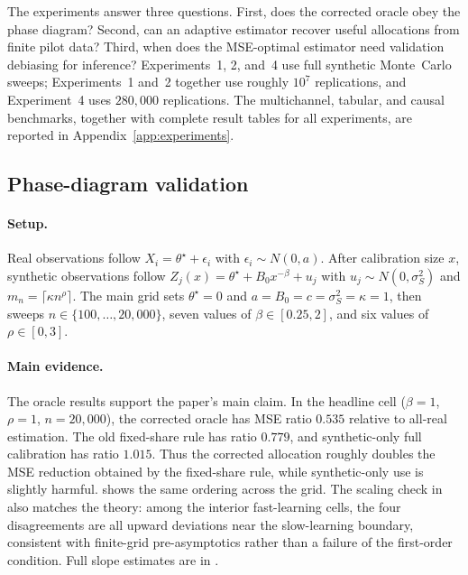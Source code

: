 \label{sec:experiments}

The experiments answer three questions. First, does the corrected oracle obey the phase diagram? Second, can an adaptive estimator recover useful allocations from finite pilot data? Third, when does the MSE-optimal estimator need validation debiasing for inference? Experiments~1, 2, and~4 use full synthetic Monte~Carlo sweeps; Experiments~1 and~2 together use roughly $10^7$ replications, and Experiment~4 uses $280{,}000$ replications. The multichannel, tabular, and causal benchmarks, together with complete result tables for all experiments, are reported in Appendix~\ref{app:experiments}.

\subsection{Phase-diagram validation}\label{ssec:exp1}

\paragraph{Setup.} Real observations follow $X_i=\theta^\star+\epsilon_i$ with $\epsilon_i\sim N(0,a)$. After calibration size $x$, synthetic observations follow $Z_j(x)=\theta^\star+B_0x^{-\beta}+u_j$ with $u_j\sim N(0,\sigma_S^2)$ and $m_n=\lceil \kappa n^\rho\rceil$. The main grid sets $\theta^\star=0$ and $a=B_0=c=\sigma_S^2=\kappa=1$, then sweeps $n\in\{100,\ldots,20{,}000\}$, seven values of $\beta\in[0.25,2]$, and six values of $\rho\in[0,3]$.

\paragraph{Main evidence.} The oracle results support the paper's main claim. In the headline cell ($\beta=1$, $\rho=1$, $n=20{,}000$), the corrected oracle has MSE ratio $0.535$ relative to all-real estimation. The old fixed-share rule has ratio $0.779$, and synthetic-only full calibration has ratio $1.015$. Thus the corrected allocation roughly doubles the MSE reduction obtained by the fixed-share rule, while synthetic-only use is slightly harmful.  shows the same ordering across the grid. The scaling check in  also matches the theory: among the interior fast-learning cells, the four disagreements are all upward deviations near the slow-learning boundary, consistent with finite-grid pre-asymptotics rather than a failure of the first-order condition. Full slope estimates are in .

